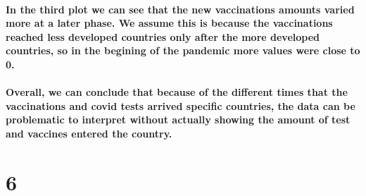 \documentclass[
]{article}
\newenvironment{Shaded}{\begin{snugshade}}{\end{snugshade}}
\newcommand{\AttributeTok}[1]{\textcolor[rgb]{0.77,0.63,0.00}{#1}}
\newcommand{\ConstantTok}[1]{\textcolor[rgb]{0.00,0.00,0.00}{#1}}
\newcommand{\DecValTok}[1]{\textcolor[rgb]{0.00,0.00,0.81}{#1}}
\newcommand{\FunctionTok}[1]{\textcolor[rgb]{0.00,0.00,0.00}{#1}}
\newcommand{\NormalTok}[1]{#1}
\newcommand{\OtherTok}[1]{\textcolor[rgb]{0.56,0.35,0.01}{#1}}
\newcommand{\SpecialCharTok}[1]{\textcolor[rgb]{0.00,0.00,0.00}{#1}}
\begin{document}
\hypertarget{in-the-third-plot-we-can-see-that-the-new-vaccinations-amounts-varied-more-at-a-later-phase.-we-assume-this-is-because-the-vaccinations-reached-less-developed-countries-only-after-the-more-developed-countries-so-in-the-begining-of-the-pandemic-more-values-were-close-to-0.}{%
\paragraph{In the third plot we can see that the new vaccinations
amounts varied more at a later phase. We assume this is because the
vaccinations reached less developed countries only after the more
developed countries, so in the begining of the pandemic more values were
close to
0.}\label{in-the-third-plot-we-can-see-that-the-new-vaccinations-amounts-varied-more-at-a-later-phase.-we-assume-this-is-because-the-vaccinations-reached-less-developed-countries-only-after-the-more-developed-countries-so-in-the-begining-of-the-pandemic-more-values-were-close-to-0.}}

\hypertarget{overall-we-can-conclude-that-because-of-the-different-times-that-the-vaccinations-and-covid-tests-arrived-specific-countries-the-data-can-be-problematic-to-interpret-without-actually-showing-the-amount-of-test-and-vaccines-entered-the-country.}{%
\paragraph{Overall, we can conclude that because of the different times
that the vaccinations and covid tests arrived specific countries, the
data can be problematic to interpret without actually showing the amount
of test and vaccines entered the
country.}\label{overall-we-can-conclude-that-because-of-the-different-times-that-the-vaccinations-and-covid-tests-arrived-specific-countries-the-data-can-be-problematic-to-interpret-without-actually-showing-the-amount-of-test-and-vaccines-entered-the-country.}}

\hypertarget{section-5}{%
\section{6}\label{section-5}}

\begin{Shaded}
\end{Shaded}
\end{document}
